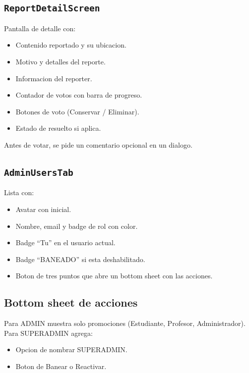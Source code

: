 \subsection{\texttt{ReportDetailScreen}}

Pantalla de detalle con:

\begin{itemize}[leftmargin=*]
  \item Contenido reportado y su ubicacion.
  \item Motivo y detalles del reporte.
  \item Informacion del reporter.
  \item Contador de votos con barra de progreso.
  \item Botones de voto (Conservar / Eliminar).
  \item Estado de resuelto si aplica.
\end{itemize}

Antes de votar, se pide un comentario opcional en un dialogo.

\subsection{\texttt{AdminUsersTab}}

Lista con:

\begin{itemize}[leftmargin=*]
  \item Avatar con inicial.
  \item Nombre, email y badge de rol con color.
  \item Badge ``Tu'' en el usuario actual.
  \item Badge ``BANEADO'' si esta deshabilitado.
  \item Boton de tres puntos que abre un bottom sheet con las acciones.
\end{itemize}

\subsection{Bottom sheet de acciones}

Para ADMIN muestra solo promociones (Estudiante, Profesor, Administrador).
Para SUPERADMIN agrega:

\begin{itemize}[leftmargin=*]
  \item Opcion de nombrar SUPERADMIN.
  \item Boton de Banear o Reactivar.
\end{itemize}

